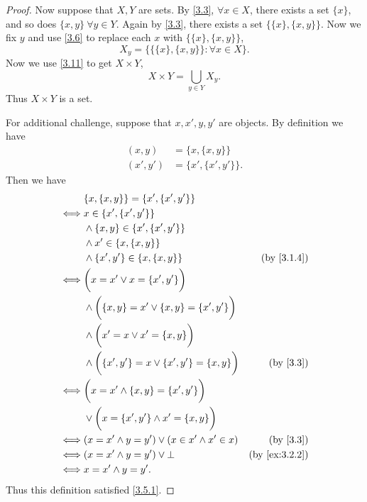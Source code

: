 \begin{proof}
  Now suppose that \(X, Y\) are sets.
  By \cref{3.3}, \(\forall x \in X\), there exists a set \(\{x\}\), and so does \(\{x, y\} \ \forall y \in Y\).
  Again by \cref{3.3}, there exists a set \(\{\{x\}, \{x, y\}\}\).
  Now we fix \(y\) and use \cref{3.6} to replace each \(x\) with \(\{\{x\}, \{x, y\}\}\),
  \[
    X_y = \{\{\{x\}, \{x, y\}\} : \forall x \in X\}.
  \]
  Now we use \cref{3.11} to get \(X \times Y\),
  \[
    X \times Y = \bigcup_{y \in Y} X_y.
  \]
  Thus \(X \times Y\) is a set.

  For additional challenge, suppose that \(x, x', y, y'\) are objects.
  By definition we have
  \begin{align*}
    (x, y)   & = \{x, \{x, y\}\}     \\
    (x', y') & = \{x', \{x', y'\}\}.
  \end{align*}
  Then we have
  \begin{align*}
         & \{x, \{x, y\}\} = \{x', \{x', y'\}\}                                                      \\
    \iff & x \in \{x', \{x', y'\}\}                                                                  \\
         & \land \{x, y\} \in \{x', \{x', y'\}\}                                                     \\
         & \land x' \in \{x, \{x, y\}\}                                                              \\
         & \land \{x', y'\} \in \{x, \{x, y\}\}                        & \text{(by \cref{3.1.4})}    \\
    \iff & \bigg(x = x' \lor x = \{x', y'\}\bigg)                                                    \\
         & \land \bigg(\{x, y\} = x' \lor \{x, y\} = \{x', y'\}\bigg)                                \\
         & \land \bigg(x' = x \lor x' = \{x, y\}\bigg)                                               \\
         & \land \bigg(\{x', y'\} = x \lor \{x', y'\} = \{x, y\}\bigg) & \text{(by \cref{3.3})}      \\
    \iff & \bigg(x = x' \land \{x, y\} = \{x', y'\}\bigg)                                            \\
         & \lor \bigg(x = \{x', y'\} \land x' = \{x, y\}\bigg)                                       \\
    \iff & (x = x' \land y = y') \lor (x \in x' \land x' \in x)        & \text{(by \cref{3.3})}      \\
    \iff & (x = x' \land y = y') \lor \bot                             & \text{(by \cref{ex:3.2.2})} \\
    \iff & x = x' \land y = y'.
  \end{align*}
  Thus this definition satisfied \cref{3.5.1}.
\end{proof}

